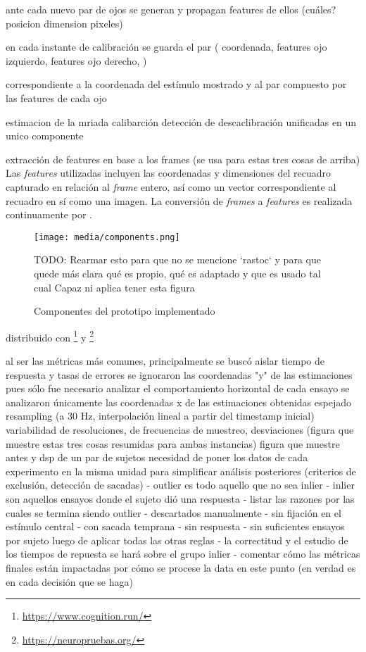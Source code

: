 ante cada nuevo par de ojos se generan y propagan features de ellos (cuáles?
posicion dimension pixeles)

en cada instante de calibración se guarda el par (
coordenada,
features ojo izquierdo,
features ojo derecho,
)

correspondiente a la
coordenada del estímulo mostrado y al par compuesto por las features de cada
ojo 

estimacion de la mriada
calibarción
detección de descaclibración
unificadas en un unico componente

extracción de features en base a los frames (se usa para estas tres cosas de
arriba)
Las \textit{features} utilizadas incluyen las coordenadas y dimensiones del
recuadro capturado en relación al \textit{frame} entero, así como un vector
correspondiente al recuadro en sí como una imagen.
La conversión de \textit{frames} a \textit{features} es realizada continuamente
por \webgazer.


\begin{figure}
    \centering
    \texttt{[image: media/components.png]}

    TODO: Rearmar esto para que no se mencione `rastoc` y para que quede más
          clara qué es propio, qué es adaptado y que es usado tal cual
          Capaz ni aplica tener esta figura

    \caption{Componentes del prototipo implementado}
    \label{fig:components}
\end{figure}


distribuido con \cognition \footnote{\url{https://www.cognition.run/}} y
\neuropruebas \footnote{\url{https://neuropruebas.org/}}


al ser las métricas más comunes, principalmente se buscó aislar tiempo de
respuesta y tasas de errores
se ignoraron las coordenadas "y" de las estimaciones pues sólo fue necesario
analizar el comportamiento horizontal de cada ensayo
se analizaron únicamente las coordenadas x de las estimaciones obtenidas
espejado
resampling (a 30 Hz, interpolación lineal a partir del timestamp inicial)
variabilidad de resoluciones, de frecuencias de muestreo, desviaciones (figura
que muestre estas tres cosas resumidas para ambas instancias)
figura que muestre antes y dsp de un par de sujetos
necesidad de poner los datos de cada experimento en la misma unidad para
simplificar análisis posteriores (criterios de exclusión, detección de sacadas)
- outlier es todo aquello que no sea inlier
- inlier son aquellos ensayos donde el sujeto dió una respuesta 
- listar las razones por las cuales se termina siendo outlier
 - descartados manualmente
 - sin fijación en el estímulo central
 - con sacada temprana
 - sin respuesta
 - sin suficientes ensayos por sujeto luego de aplicar todas las otras reglas
- la correctitud y el estudio de los tiempos de repuesta se hará sobre el
  grupo inlier
- comentar cómo las métricas finales están impactadas por cómo se procese la
  data en este punto (en verdad es en cada decisión que se haga)




